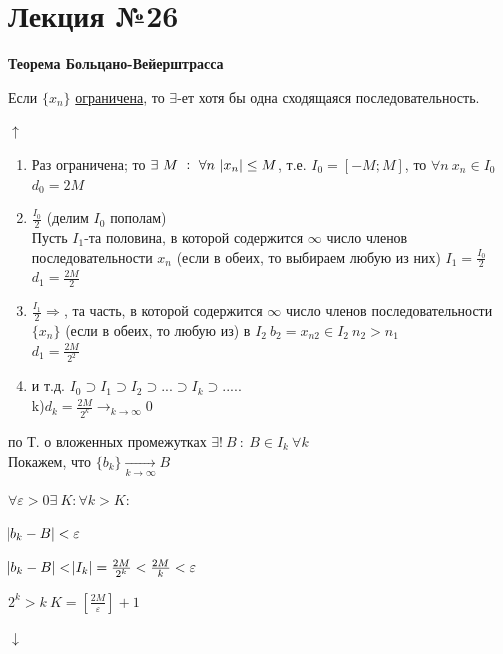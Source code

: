\documentclass{article}
\begin{document}
    \section{Лекция №26}

    \textbf{Теорема Больцано-Вейерштрасса} 

    Если \( \{x_n\} \) \underline{ограничена}, то \( \exists \)-ет хотя бы одна сходящаяся последовательность.

    \(\uparrow\)
    \begin{enumerate}
        \item Раз ограничена; то \(\exists\ M\ :\ \forall n\ \abs{x_n} \leq M\), т.е. \(I_0 = [-M; M]\), то \(\forall n\ x_n \in I_0\)\\
        \( d_0 = 2M \)

        \item \( \frac{I_0}{2} \) (делим \( I_0 \) пополам)\\
        Пусть \( I_1 \)-та половина, в которой содержится \( \infty \) число членов последовательности \(x_n\) (если в обеих, то выбираем любую из них) \( I_1 = \frac{I_0}{2} \)\\
        \( d_1 = \frac{2M}{2} \)

        \item \( \frac{I_1}{2} \Rightarrow\), та часть, в которой содержится \( \infty \) число членов последовательности \( \{x_n\} \) (если в обеих, то любую из) в \( I_2\ b_2 = x_{n2} \in I_2\ n_2>n_1 \)\\
        \( d_1 = \frac{2M}{2^2} \)
        \item и т.д. \(I_0 \supset I_1 \supset I_2 \supset ... \supset I_k \supset .....\)
        \\k)\(d_k = \frac{2M}{2^k} \longrightarrow_{k \rightarrow \infty} 0\)
    \end{enumerate}
    по Т. о вложенных промежутках \(\exists !\ B\ :\ B \in I_k\ \forall k\)
    \\Покажем, что \(\{b_k\} \xrightarrow[k \rightarrow \infty]{} B\)
    
    \( \forall \varepsilon > 0 \exists\ K: \forall k > K:\) 

    \(\abs{b_k - B} < \varepsilon\)

    \( \abs{b_k - B} < \abs{I_k} = \frac{2M}{2^k} < \frac{2M}{k} < \varepsilon \)

    \( 2^k > k\ K = [\frac{2M}{\varepsilon}] + 1\)

    \(\downarrow\)
    
\end{document}
